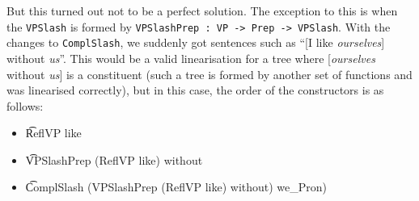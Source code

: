 But this turned out not to be a perfect solution. The exception to this
is when the \texttt{VPSlash} is formed by
\texttt{VPSlashPrep : VP -\textgreater{} Prep -\textgreater{} VPSlash}.
With the changes to \texttt{ComplSlash}, we suddenly got sentences such
as ``{[}I like \emph{ourselves}{]} without \emph{us}''. This would be a
valid linearisation for a tree where {[}\emph{ourselves} without
\emph{us}{]} is a constituent (such a tree is formed by another set of
functions and was linearised correctly), but in this case, the order of
the constructors is as follows:

\begin{itemize}
\item
  \t{ReflVP like}

\begin{EmptyItem}
\begin{Highlighting}[]
    \FunctionTok{=}  \NormalTok{;}
\FunctionTok{=}  \OtherTok{=>}  \NormalTok{; } \OtherTok{=>}  
\end{Highlighting}
\end{EmptyItem}

\item
  \t{VPSlashPrep (ReflVP like) without}

\begin{EmptyItem}
\begin{Highlighting}[]
    \FunctionTok{=}  \NormalTok{;}
\FunctionTok{=}  \OtherTok{=>}  \NormalTok{; } \OtherTok{=>}  
 \FunctionTok{=} 
\end{Highlighting}
\end{EmptyItem}

\item \t{ComplSlash (VPSlashPrep (ReflVP like) without) we\_Pron)}

\begin{EmptyItem}
\begin{Highlighting}[]
    \FunctionTok{=}  \NormalTok{;}
\FunctionTok{=}  \OtherTok{=>}  \NormalTok{; } \OtherTok{=>}  
  \FunctionTok{=} 
\end{Highlighting}
\end{EmptyItem}

\end{itemize}

